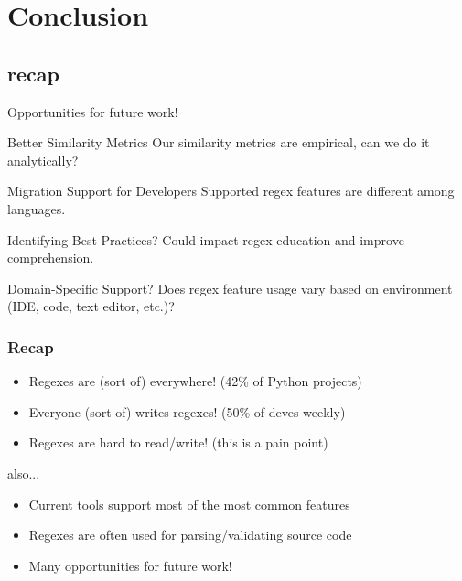 \section{Conclusion}
\subsection{recap}


\begin{frame}{Opportunities for future work!}

\begin{block}{Better Similarity Metrics}
Our similarity metrics are empirical, can we do it analytically?
\end{block}



\begin{block}{Migration Support for Developers}
Supported regex features are different among languages.
\end{block}


\begin{block}{Identifying Best Practices?}
Could impact regex education and improve comprehension. 
\end{block}


\begin{block}{Domain-Specific Support?}
Does regex feature usage vary based on environment (IDE, code, text editor, etc.)?
\end{block}



\end{frame}

\begin{frame}
\frametitle{Recap}

\begin{itemize}
\item Regexes are (sort of) everywhere! (42\% of Python projects)
\item<2-> Everyone (sort of) writes regexes! (50\% of deves weekly)
\item<3-> Regexes are hard to read/write! (this is a pain point)
\end{itemize}

also...

\begin{itemize}
\item Current tools support most of the most common features
\item Regexes are often used for parsing/validating source code 
\item Many opportunities for future work!
\end{itemize}


\end{frame}


